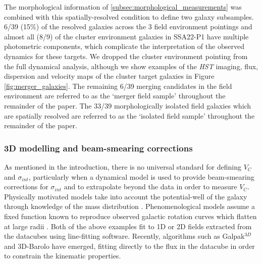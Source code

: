 \documentclass[fleqn,usenatbib]{mnras}
\begin{document}
The morphological information of \cref{subsec:morphological_measurements} was combined with this spatially-resolved condition to define two galaxy subsamples.
6/39 (15\%) of the resolved galaxies across the 3 field environment pointings and almost all (8/9) of the cluster environment galaxies in SSA22-P1 have multiple photometric components, which complicate the interpretation of the observed dynamics for these targets.
We dropped the cluster environment pointing from the full dynamical analysis, although we show examples of the {\em HST} imaging, flux, dispersion and velocity maps of the cluster target galaxies in Figure \ref{fig:merger_galaxies}.
The remaining 6/39 merging candidates in the field environment are referred to as the `merger field sample' throughout the remainder of the paper.
The 33/39 morphologically isolated field galaxies which are spatially resolved are referred to as the `isolated field sample' throughout the remainder of the paper.

\subsubsection{3D modelling and beam-smearing corrections}\label{subsec:3d_modelling}

As mentioned in the introduction, there is no universal standard for defining $V_{C}$ and $\sigma_{int}$, particularly when a dynamical model is used to provide beam-smearing corrections for $\sigma_{int}$ and to extrapolate beyond the data in order to measure $V_{C}$.
Physically motivated models take into account the potential-well of the galaxy through knowledge of the mass distribution \citep[e.g.][]{Genzel2008,ForsterSchreiber2009,Gnerucci2011,Wisnioski2015,Swinbank2017}.
Phenomenological models assume a fixed function known to reproduce observed galactic rotation curves which flatten at large radii \citep[e.g.][]{Epinat2010,Epinat2012,Swinbank2012,Stott2016,Harrison2017}.
Both of the above examples fit to 1D or 2D fields extracted from the datacubes using line-fitting software.
Recently, algorithms such as Galpak$^{3D}$ \citep{Bouche2015} and 3D-Barolo \citep{DiTeodoro2015} have emerged, fitting directly to the flux in the datacube in order to constrain the kinematic properties.
\end{document}
